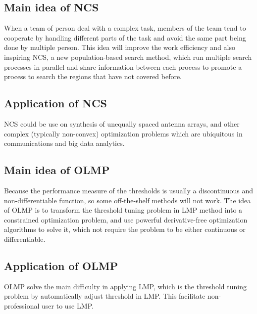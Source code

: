 \subsection{Main idea of NCS}
When a team of person deal with a complex task, members of the team tend to cooperate by handling different parts of the task and avoid the same part being done by multiple person. This idea will improve the work efficiency and also inspiring NCS\cite{ncs}, a new population-based search method, which run multiple search processes in parallel and share information between each process to promote a process to search the regions that have not covered before.
\subsection{Application of NCS}
NCS could be use on synthesis of unequally spaced antenna arrays, and other complex (typically non-convex) optimization problems which are ubiquitous in communications and big data analytics\cite{ncs}.
\subsection{Main idea of OLMP}
Because the performance measure of the thresholds is usually a discontinuous and non-differentiable function, so some off-the-shelf methods will not work.
The idea of OLMP is to transform the threshold tuning problem in LMP method into a constrained optimization problem, and use powerful derivative-free optimization algorithms to solve it\cite{olmp}, which not require the problem to be either continuous or differentiable.
\subsection{Application of OLMP}
OLMP solve the main difficulty in applying LMP, which is the threshold tuning problem by automatically adjust threshold in LMP. This facilitate non-professional user to use LMP.
